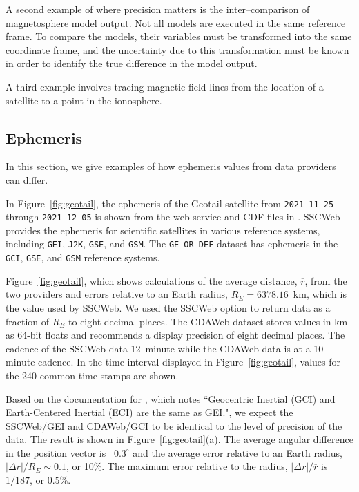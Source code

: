 \documentclass[draft]{agujournal2019}
\begin{document}
A second example of where precision matters is the inter--comparison of magnetosphere model output. Not all models are executed in the same reference frame. To compare the models, their variables must be transformed into the same coordinate frame, and the uncertainty due to this transformation must be known in order to identify the true difference in the model output.

A third example involves tracing magnetic field lines from the location of a satellite to a point in the ionosphere.


\subsection{Ephemeris}
\label{sect:comparisons_ephemeris}

In this section, we give examples of how ephemeris values from data providers can differ.

In Figure~\ref{fig:geotail}, the ephemeris of the Geotail satellite from \texttt{2021-11-25} through \texttt{2021-12-05} is shown from the  web service and CDF files in . SSCWeb provides the ephemeris for scientific satellites in various reference systems, including \texttt{GEI}, \texttt{J2K}, \texttt{GSE}, and \texttt{GSM}. The \texttt{GE\_OR\_DEF} dataset has ephemeris in the \texttt{GCI}, \texttt{GSE}, and \texttt{GSM} reference systems.

Figure~\ref{fig:geotail}, which shows calculations of the average distance, $\overline{r}$, from the two providers and errors relative to an Earth radius, $R_E=6378.16$~km, which is the value used by SSCWeb. We used the SSCWeb option to return data as a fraction of $R_E$ to eight decimal places. The CDAWeb dataset stores values in km as 64-bit floats and recommends a display precision of eight decimal places. The cadence of the SSCWeb data 12--minute while the CDAWeb data is at a 10--minute cadence. In the time interval displayed in Figure~\ref{fig:geotail}, values for the 240 common time stamps are shown.

Based on the documentation for , which notes ``Geocentric Inertial (GCI) and Earth-Centered Inertial (ECI) are the same as GEI.", we expect the SSCWeb/GEI and CDAWeb/GCI to be identical to the level of precision of the data. The result is shown in Figure~\ref{fig:geotail}(a). The average angular difference in the position vector is ~$0.3^\circ$ and the average error relative to an Earth radius, $|\Delta r|/R_E\sim 0.1$, or 10\%. The maximum error relative to the radius, $|\Delta r|/\overline{r}$ is $1/187$, or $0.5$\%.
\end{document}
